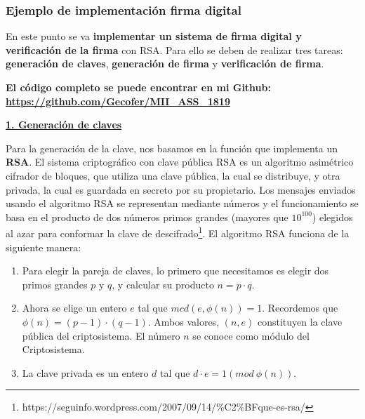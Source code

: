 \documentclass{manual}
\begin{document}





\subsubsection{Ejemplo de implementación firma digital}

En este punto se va \textbf{implementar un sistema de firma digital y verificación de la firma} con RSA. Para ello se deben de realizar tres tareas: \textbf{generación de claves}, \textbf{generación de firma} y \textbf{verificación de firma}.

\begin{center}\textbf{El código completo se puede encontrar en mi Github: \url{https://github.com/Gecofer/MII_ASS_1819}}\end{center}

\underline{\textbf{1. Generación de claves}}

Para la generación de la clave, nos basamos en la función que implementa un \textbf{RSA}. El sistema criptográfico con clave pública RSA es un algoritmo asimétrico cifrador de bloques, que utiliza una clave pública, la cual se distribuye, y otra privada, la cual es guardada en secreto por su propietario. Los mensajes enviados usando el algoritmo RSA se representan mediante números y el funcionamiento se basa en el producto de dos números primos grandes (mayores que $10^{100}$) elegidos al azar para conformar la clave de descifrado\footnote{https://seguinfo.wordpress.com/2007/09/14/\%C2\%BFque-es-rsa/}. El algoritmo RSA funciona de la siguiente manera:

\begin{enumerate}
	\item Para elegir la pareja de claves, lo primero que necesitamos es elegir dos primos grandes $p$ y $q$, y calcular su producto $n = p \cdot q$.
	
	\item Ahora se elige un entero $e$ tal que $mcd(e,\phi(n)) = 1$. Recordemos que $\phi(n) = (p-1)\cdot(q-1)$. Ambos valores, $(n, e)$ constituyen la clave pública del criptosistema. El número $n$ se conoce como módulo del Criptosistema.
	
	\item La clave privada es un entero $d$ tal que $d \cdot e = 1 (mod\ {\phi(n)})$.
\end{enumerate}
\end{document}
